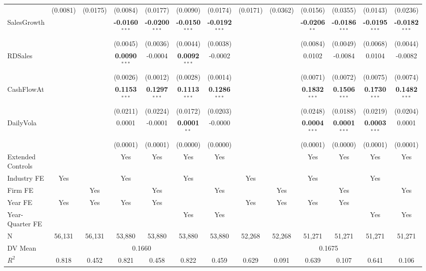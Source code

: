 \documentclass[11pt,a4paper]{article}
\begin{document}
\begin{table}[htbp]
\begin{tabular}{lcccccccccccc}
 & (0.0081) & (0.0175) & (0.0084) & (0.0177) & (0.0090) & (0.0174) & (0.0171) & (0.0362) & (0.0156) & (0.0355) & (0.0143) & (0.0236) \\
SalesGrowth &  &  & \textbf{-0.0160}$^{***}$ & \textbf{-0.0200}$^{***}$ & \textbf{-0.0150}$^{***}$ & \textbf{-0.0192}$^{***}$ &  &  & \textbf{-0.0206}$^{**}$ & \textbf{-0.0186}$^{***}$ & \textbf{-0.0195}$^{***}$ & \textbf{-0.0182}$^{***}$ \\
 &  &  & (0.0045) & (0.0036) & (0.0044) & (0.0038) &  &  & (0.0084) & (0.0049) & (0.0068) & (0.0044) \\
RDSales &  &  & \textbf{0.0090}$^{***}$ & -0.0004 & \textbf{0.0092}$^{***}$ & -0.0002 &  &  & 0.0102 & -0.0084 & 0.0104 & -0.0082 \\
 &  &  & (0.0026) & (0.0012) & (0.0028) & (0.0014) &  &  & (0.0071) & (0.0072) & (0.0075) & (0.0074) \\
CashFlowAt &  &  & \textbf{0.1153}$^{***}$ & \textbf{0.1297}$^{***}$ & \textbf{0.1113}$^{***}$ & \textbf{0.1286}$^{***}$ &  &  & \textbf{0.1832}$^{***}$ & \textbf{0.1506}$^{***}$ & \textbf{0.1730}$^{***}$ & \textbf{0.1482}$^{***}$ \\
 &  &  & (0.0211) & (0.0224) & (0.0172) & (0.0203) &  &  & (0.0248) & (0.0188) & (0.0219) & (0.0204) \\
DailyVola &  &  & 0.0001 & -0.0001 & \textbf{0.0001}$^{**}$ & -0.0000 &  &  & \textbf{0.0004}$^{***}$ & \textbf{0.0001}$^{***}$ & \textbf{0.0003}$^{***}$ & 0.0001 \\
 &  &  & (0.0001) & (0.0001) & (0.0000) & (0.0000) &  &  & (0.0001) & (0.0000) & (0.0001) & (0.0001) \\
\midrule
Extended Controls &  &  & Yes & Yes & Yes & Yes &  &  & Yes & Yes & Yes & Yes \\
Industry FE & Yes &  & Yes &  & Yes &  & Yes &  & Yes &  & Yes &  \\
Firm FE &  & Yes &  & Yes &  & Yes &  & Yes &  & Yes &  & Yes \\
Year FE & Yes & Yes & Yes & Yes &  &  & Yes & Yes & Yes & Yes &  &  \\
Year-Quarter FE &  &  &  &  & Yes & Yes &  &  &  &  & Yes & Yes \\
\midrule
N & 56,131 & 56,131 & 53,880 & 53,880 & 53,880 & 53,880 & 52,268 & 52,268 & 51,271 & 51,271 & 51,271 & 51,271 \\
DV Mean & \multicolumn{6}{c}{0.1660} & \multicolumn{6}{c}{0.1675} \\
$R^2$ & 0.818 & 0.452 & 0.821 & 0.458 & 0.822 & 0.459 & 0.629 & 0.091 & 0.639 & 0.107 & 0.641 & 0.106 \\

\end{tabular}
\end{table}
\end{document}
